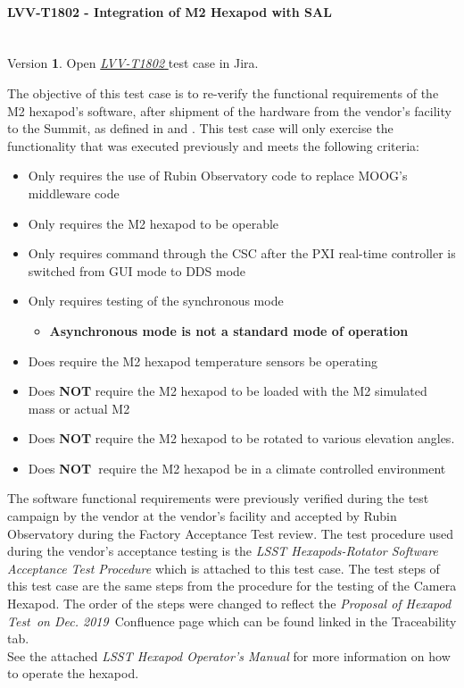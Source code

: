 \documentclass[SE,lsstdraft,STR,toc]{lsstdoc}
\providecommand{\tightlist}{
  \setlength{\itemsep}{0pt}\setlength{\parskip}{0pt}}
\begin{document}
\paragraph{ LVV-T1802 - Integration of M2 Hexapod with SAL }\mbox{}\\

Version \textbf{1}.
Open  \href{https://jira.lsstcorp.org/secure/Tests.jspa#/testCase/LVV-T1802}{\textit{ LVV-T1802 } }
test case in Jira.

The objective of this test case is to re-verify the functional
requirements of the M2 hexapod's software, after shipment of the
hardware from the vendor's facility to the Summit, as defined in 
and . This test case will only exercise the functionality that
was executed previously and meets the following criteria:

\begin{itemize}
\tightlist
\item
  Only requires the use of Rubin Observatory code to replace MOOG's
  middleware code
\item
  Only requires the M2 hexapod to be operable
\item
  Only requires command through the CSC after the PXI real-time
  controller is switched from GUI mode to DDS mode
\item
  Only requires testing of the synchronous mode

  \begin{itemize}
  \tightlist
  \item
    \textbf{Asynchronous mode is not a standard mode of operation}
  \end{itemize}
\item
  Does require the M2 hexapod temperature sensors be operating
\item
  Does \textbf{NOT} require the M2 hexapod to be loaded with the M2
  simulated mass or actual M2
\item
  Does \textbf{NOT} require the M2 hexapod to be rotated to various
  elevation angles.
\item
  Does \textbf{NOT~}require the M2 hexapod be in a climate controlled
  environment
\end{itemize}

The software functional requirements were previously verified during the
test campaign by the vendor at the vendor's facility and accepted by
Rubin Observatory during the Factory Acceptance Test review. The test
procedure used during the vendor's acceptance testing is the \emph{LSST
Hexapods-Rotator Software Acceptance Test Procedure} which is attached
to this test case. The test steps of this test case are the same steps
from the procedure for the testing of the Camera Hexapod. The order of
the steps were changed to reflect the \emph{Proposal of Hexapod Test~on
Dec. 2019~}Confluence page which can be found linked in the Traceability
tab.\\[2\baselineskip]See the attached \emph{LSST Hexapod Operator's
Manual} for more information on how to operate the hexapod.
\end{document}
